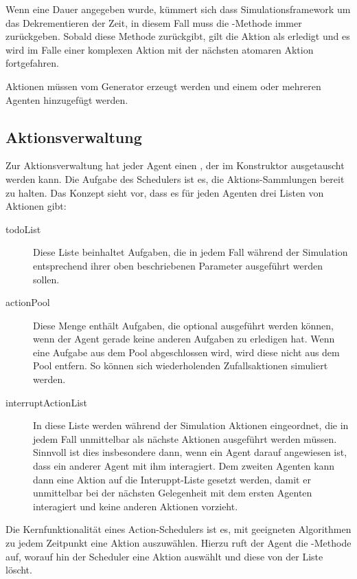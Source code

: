 Wenn eine Dauer angegeben wurde, kümmert sich dass Simulationsframework um das Dekrementieren der Zeit, in diesem Fall muss die -Methode immer  zurückgeben. Sobald diese Methode  zurückgibt, gilt die Aktion als erledigt und es wird im Falle einer komplexen Aktion mit der nächsten atomaren Aktion fortgefahren.

Aktionen müssen vom Generator erzeugt werden und einem oder mehreren Agenten hinzugefügt werden.

\subsection{Aktionsverwaltung}\label{subsec:concept_actionhandling}
Zur Aktionsverwaltung hat jeder Agent einen , der im Konstruktor ausgetauscht werden kann. Die Aufgabe des Schedulers ist es, die Aktions-Sammlungen bereit zu halten. Das Konzept sieht vor, dass es für jeden Agenten drei Listen von Aktionen gibt:
\begin{description}
	\item[todoList] Diese Liste beinhaltet Aufgaben, die in jedem Fall während der Simulation entsprechend ihrer oben beschriebenen Parameter ausgeführt werden sollen.
	\item[actionPool] Diese Menge enthält Aufgaben, die optional ausgeführt werden können, wenn der Agent gerade keine anderen Aufgaben zu erledigen hat. Wenn eine Aufgabe aus dem Pool abgeschlossen wird, wird diese nicht aus dem Pool entfern. So können sich wiederholenden Zufallsaktionen simuliert werden.
	\item[interruptActionList] In diese Liste werden während der Simulation Aktionen eingeordnet, die in jedem Fall unmittelbar als nächste Aktionen ausgeführt werden müssen. Sinnvoll ist dies insbesondere dann, wenn ein Agent darauf angewiesen ist, dass ein anderer Agent mit ihm interagiert. Dem zweiten Agenten kann dann eine Aktion auf die Interuppt-Liste gesetzt werden, damit er unmittelbar bei der nächsten Gelegenheit mit dem ersten Agenten interagiert und keine anderen Aktionen vorzieht.
\end{description}

Die Kernfunktionalität eines Action-Schedulers ist es, mit geeigneten Algorithmen zu jedem Zeitpunkt eine Aktion auszuwählen. Hierzu ruft der Agent die -Methode auf, worauf hin der Scheduler eine Aktion auswählt und diese von der Liste löscht.


